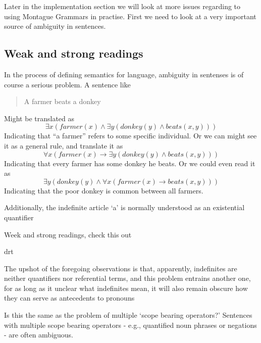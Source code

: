 \documentclass[12pt]{article}
\begin{document}
Later in the implementation section we will look at more issues regarding to using Montague Grammars in practise. First we need to look at a very important source of ambiguity in sentences.

\subsection{Weak and strong readings}

In the process of defining semantics for language, ambiguity in sentenses is of course a serious problem. A sentence like  
\begin{quotation}
A farmer beats a donkey
\end{quotation}
Might be translated as 
\begin{equation}
\exists x ( farmer(x) \wedge \exists y ( donkey(y) \wedge beats(x,y)))
\end{equation}
Indicating that ``a farmer'' refers to some specific individual. Or we can might see it as a general rule, and translate it as
\begin{equation}
\forall x ( farmer(x) \rightarrow \exists y ( donkey(y) \wedge beats(x,y)))
\end{equation}
Indicating that every farmer has some donkey he beats. Or we could even read it as
\begin{equation}
\exists y ( donkey(y) \wedge \forall x ( farmer(x) \rightarrow beats(x,y)))
\end{equation}
Indicating that the poor donkey is common between all farmers.

Additionally, the indefinite article `a' is normally understood as an existential quantifier

Week and strong readings, check this out \cite{kanazawa1994weak}


drt

The upshot of the foregoing observations is that, apparently, indefinites are neither quantifiers nor referential terms, and this problem entrains another one, for as long as it unclear what indefinites mean, it will also remain obscure how they can serve as antecedents to pronouns

Is this the same as the problem of multiple `scope bearing operators?'
Sentences with multiple scope bearing operators - e.g.,
quantified noun phrases or negations - are often ambiguous.

\end{document}
